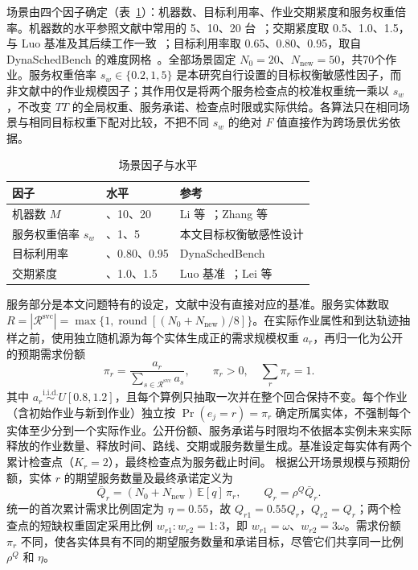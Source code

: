 场景由四个因子确定（表~\ref{tab:factors}）：机器数、目标利用率、作业交期紧度和服务权重倍率。机器数的水平参照文献中常用的 5、10、20 台~\cite{li2025,zhang2024}；交期紧度取 0.5、1.0、1.5，与 Luo 基准及其后续工作一致~\cite{tiacci2024,lei2024}；目标利用率取 0.65、0.80、0.95，取自 DynaSchedBench 的难度网格~\cite{dynasched2026}。全部场景固定 $N_0=20$、$N_{\mathrm{new}}=50$，共70个作业。服务权重倍率 $s_w\in\{0.2,1,5\}$ 是本研究自行设置的目标权衡敏感性因子，而非文献中的作业规模因子；其作用仅是将两个服务检查点的校准权重统一乘以 $s_w$，不改变 $TT$ 的全局权重、服务承诺、检查点时限或实际供给。各算法只在相同场景与相同目标权重下配对比较，不把不同 $s_w$ 的绝对 $F$ 值直接作为跨场景优劣依据。

\begin{table}[t]
  \centering
  \caption{场景因子与水平}\label{tab:factors}
  \small
  \begin{tabular}{@{}>{\raggedright}p{3.0cm}>{\centering}p{2.8cm}>{\raggedright\arraybackslash}p{8.2cm}@{}}
    \toprule
    因子 & 水平 & 参考 \\
    \midrule
    机器数 $M$ & 5、10、20 & Li 等~\cite{li2025}；Zhang 等~\cite{zhang2024} \\
    服务权重倍率 $s_w$ & 0.2、1、5 & 本文目标权衡敏感性设计 \\
    目标利用率 & 0.65、0.80、0.95 & DynaSchedBench~\cite{dynasched2026} \\
    交期紧度 & 0.5、1.0、1.5 & Luo 基准~\cite{tiacci2024}；Lei 等~\cite{lei2024} \\
    \bottomrule
  \end{tabular}
\end{table}

服务部分是本文问题特有的设定，文献中没有直接对应的基准。服务实体数取 $R=|\mathcal{R}^{\mathrm{svc}}|=\max\{1,\operatorname{round}[(N_0+N_{\mathrm{new}})/8]\}$。在实际作业属性和到达轨迹抽样之前，使用独立随机源为每个实体生成正的需求规模权重 $a_r$，再归一化为公开的预期需求份额
\begin{equation}\label{eq:entity_share}
  \pi_r=\frac{a_r}{\sum_{s\in\mathcal{R}^{\mathrm{svc}}}a_s},\qquad \pi_r>0,\quad \sum_r\pi_r=1.
\end{equation}
其中 $a_r\overset{\mathrm{i.i.d.}}{\sim}U[0.8,1.2]$，且每个算例只抽取一次并在整个回合保持不变。每个作业（含初始作业与新到作业）独立按 $\Pr(e_j=r)=\pi_r$ 确定所属实体，不强制每个实体至少分到一个实际作业。公开份额、服务承诺与时限均不依据本实例未来实际释放的作业数量、释放时间、路线、交期或服务数量生成。基准设定每实体有两个累计检查点（$K_r=2$），最终检查点为服务截止时间。
根据公开场景规模与预期份额，实体 $r$ 的期望服务数量及最终承诺定义为
\begin{equation}\label{eq:entity_commitment_gen}
  \bar Q_r=(N_0+N_{\mathrm{new}})\,\mathbb{E}[q] \,\pi_r,\qquad Q_r=\rho^Q\bar Q_r.
\end{equation}
统一的首次累计需求比例固定为 $\eta=0.55$，故 $Q_{r1}=0.55Q_r$，$Q_{r2}=Q_r$；两个检查点的短缺权重固定采用比例 $w_{r1}:w_{r2}=1:3$，即 $w_{r1}=\omega$、$w_{r2}=3\omega$。需求份额 $\pi_r$ 不同，使各实体具有不同的期望服务数量和承诺目标，尽管它们共享同一比例 $\rho^Q$ 和 $\eta$。

